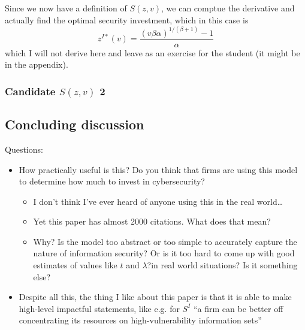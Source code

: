 \documentclass[11pt]{article}
\begin{document}
Since we now have a definition of $S(z,v)$, we can comptue the derivative and actually find the optimal security investment, which in this case is 
$$z^{I*}(v) = \frac{(v \beta \alpha )^{1/(\beta + 1)} - 1}{\alpha}$$ 
which I will not derive here and leave as an exercise for the student (it might be in the appendix).

\subsubsection{Candidate $S(z,v)$ 2}


\subsection{Concluding discussion}

Questions:
\begin{itemize}
    \item How practically useful is this? Do you think that firms are using this model to determine how much to invest in cybersecurity?
    \begin{itemize}
        \item I don't think I've ever heard of anyone using this in the real world\dots
        \item Yet this paper has almost 2000 citations. What does that mean?
        \item Why? Is the model too abstract or too simple to accurately capture the nature of information security? Or is it too hard to come up with good estimates of values like $t$ and $\lambda$?in real world situations? Is it something else?
    \end{itemize}
    \item Despite all this, the thing I like about this paper is that it is able to make high-level impactful statements, like e.g. for $S^I$ ``a firm can be better off concentrating its resources on high-vulnerability information sets''
\end{itemize}
\end{document}

